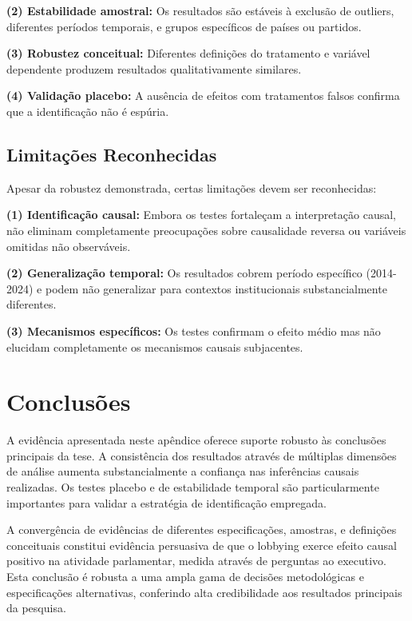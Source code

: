 \textbf{(2) Estabilidade amostral:} Os resultados são estáveis à exclusão de outliers, diferentes períodos temporais, e grupos específicos de países ou partidos.

\textbf{(3) Robustez conceitual:} Diferentes definições do tratamento e variável dependente produzem resultados qualitativamente similares.

\textbf{(4) Validação placebo:} A ausência de efeitos com tratamentos falsos confirma que a identificação não é espúria.

\subsection{Limitações Reconhecidas}

Apesar da robustez demonstrada, certas limitações devem ser reconhecidas:

\textbf{(1) Identificação causal:} Embora os testes fortaleçam a interpretação causal, não eliminam completamente preocupações sobre causalidade reversa ou variáveis omitidas não observáveis.

\textbf{(2) Generalização temporal:} Os resultados cobrem período específico (2014-2024) e podem não generalizar para contextos institucionais substancialmente diferentes.

\textbf{(3) Mecanismos específicos:} Os testes confirmam o efeito médio mas não elucidam completamente os mecanismos causais subjacentes.

\section{Conclusões}

A evidência apresentada neste apêndice oferece suporte robusto às conclusões principais da tese. A consistência dos resultados através de múltiplas dimensões de análise aumenta substancialmente a confiança nas inferências causais realizadas. Os testes placebo e de estabilidade temporal são particularmente importantes para validar a estratégia de identificação empregada.

A convergência de evidências de diferentes especificações, amostras, e definições conceituais constitui evidência persuasiva de que o lobbying exerce efeito causal positivo na atividade parlamentar, medida através de perguntas ao executivo. Esta conclusão é robusta a uma ampla gama de decisões metodológicas e especificações alternativas, conferindo alta credibilidade aos resultados principais da pesquisa.

    \label{tab:robustness_specifications}
    
